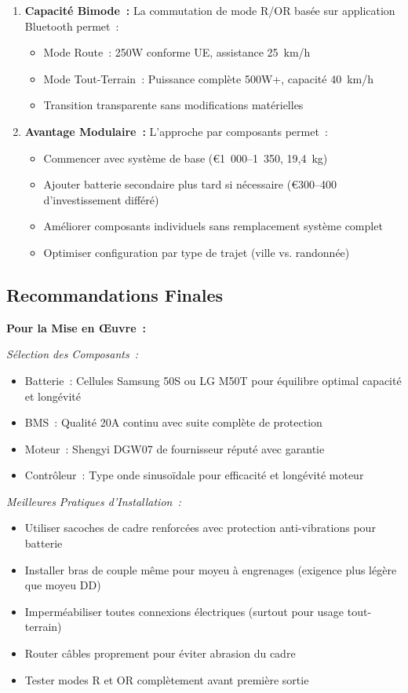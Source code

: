 \documentclass[12pt,a4paper]{article}
\begin{document}
\begin{enumerate}
    \item \textbf{Capacité Bimode~:} La commutation de mode R/OR basée sur application Bluetooth permet~:
    \begin{itemize}
        \item Mode Route~: 250W conforme UE, assistance 25~km/h
        \item Mode Tout-Terrain~: Puissance complète 500W+, capacité 40~km/h
        \item Transition transparente sans modifications matérielles
    \end{itemize}
    
    \item \textbf{Avantage Modulaire~:} L'approche par composants permet~:
    \begin{itemize}
        \item Commencer avec système de base (€1~000--1~350, 19,4~kg)
        \item Ajouter batterie secondaire plus tard si nécessaire (€300--400 d'investissement différé)
        \item Améliorer composants individuels sans remplacement système complet
        \item Optimiser configuration par type de trajet (ville vs. randonnée)
    \end{itemize}
\end{enumerate}

\subsection{Recommandations Finales}

\textbf{Pour la Mise en Œuvre~:}

\textit{Sélection des Composants~:}
\begin{itemize}
    \item Batterie~: Cellules Samsung 50S ou LG M50T pour équilibre optimal capacité et longévité
    \item BMS~: Qualité 20A continu avec suite complète de protection
    \item Moteur~: Shengyi DGW07 de fournisseur réputé avec garantie
    \item Contrôleur~: Type onde sinusoïdale pour efficacité et longévité moteur
\end{itemize}

\textit{Meilleures Pratiques d'Installation~:}
\begin{itemize}
    \item Utiliser sacoches de cadre renforcées avec protection anti-vibrations pour batterie
    \item Installer bras de couple même pour moyeu à engrenages (exigence plus légère que moyeu DD)
    \item Imperméabiliser toutes connexions électriques (surtout pour usage tout-terrain)
    \item Router câbles proprement pour éviter abrasion du cadre
    \item Tester modes R et OR complètement avant première sortie
\end{itemize}
\end{document}
